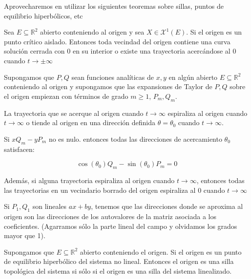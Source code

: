 \begin{rmrk}
	Aprovecharemos en utilizar los siguientes teoremas sobre sillas, puntos de equilibrio hiperbólicos, etc
\end{rmrk}


\begin{thm}[Bendixson]
	Sea $E\subseteq \mathbb{R}^2$  abierto conteniendo al origen y sea $X\in \mathcal{X}^1(E)$. Si el origen es un punto crítico aislado. Entonces toda vecindad del origen contiene una curva solución cerrada con $0$ en su interior o existe una trayectoria acercándose al $0$ cuando $t\to \pm \infty$
\end{thm}

\begin{thm}
	Supongamos que $P,Q$ sean funciones analíticas de $x,y$ en algún abierto $E\subseteq \mathbb{R}^2$ conteniendo al origen y supongamos que las expansiones de Taylor de $P,Q$ sobre el origen empiezan con términos de grado $m\geq 1$, $P_m, Q_m$.
	
	La trayectoria que se acerque al origen cuando $t\to \infty$ espiraliza al origen cuando $t\to \infty$ o tiende al  origen en una dirección definida $\theta = \theta_0$ cuando $t\to \infty$.
	
	Si $xQ_m-yP_m$ no es nulo. entonces todas las direcciones de acercamiento $\theta_0$ satisfacen:
	
	\begin{equation*}
		\cos(\theta_0) Q_m-\sin(\theta_0)P_m = 0
	\end{equation*}
	
	Además, si alguna trayectoria espiraliza al origen cuando $t\to \infty$, entonces todas las trayectorias en un vecindario borrado del origen espiraliza al $0$ cuando $t\to \infty$
\end{thm}

\begin{rmrk}
	Si $P_1,Q_1$ son lineales $ax+by$, tenemos que las direcciones donde se aproxima al origen son las direcciones de los autovalores de la matriz asociada a los coeficientes. (Agarramos sólo la parte lineal del campo y olvidamos los grados mayor que 1).
\end{rmrk}

\begin{thm}
	Supongamos que $E\subseteq \mathbb{R}^2$ abierto conteniendo el origen. Si el origen es un punto de equilibrio hiperbólico del sistema no lineal. Entonces el origen es una silla topológica del sistema si sólo si el origen es una silla del sistema linealizado.
\end{thm}

